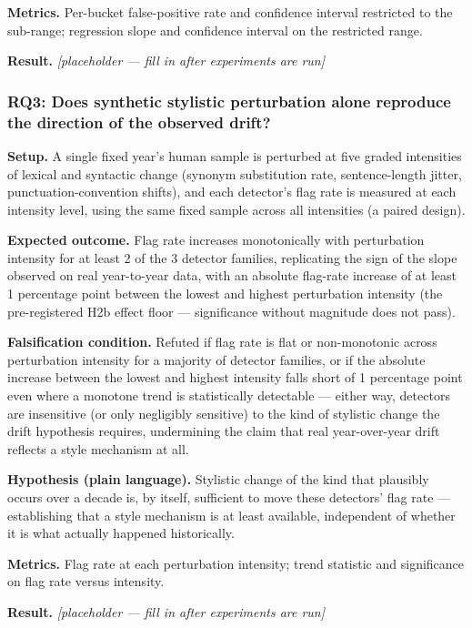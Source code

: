 \documentclass[11pt]{article}
\newcommand{\ph}{\textit{[placeholder --- fill in after experiments are run]}}
\begin{document}
\textbf{Metrics.} Per-bucket false-positive rate and confidence interval restricted to the sub-range; regression slope and confidence interval on the restricted range.

\textbf{Result.} \ph

\subsubsection{RQ3: Does synthetic stylistic perturbation alone reproduce the direction of the observed drift?}
\textbf{Setup.} A single fixed year's human sample is perturbed at five graded intensities of lexical and syntactic change (synonym substitution rate, sentence-length jitter, punctuation-convention shifts), and each detector's flag rate is measured at each intensity level, using the same fixed sample across all intensities (a paired design).

\textbf{Expected outcome.} Flag rate increases monotonically with perturbation intensity for at least 2 of the 3 detector families, replicating the sign of the slope observed on real year-to-year data, with an absolute flag-rate increase of at least 1 percentage point between the lowest and highest perturbation intensity (the pre-registered H2b effect floor --- significance without magnitude does not pass).

\textbf{Falsification condition.} Refuted if flag rate is flat or non-monotonic across perturbation intensity for a majority of detector families, or if the absolute increase between the lowest and highest intensity falls short of 1 percentage point even where a monotone trend is statistically detectable --- either way, detectors are insensitive (or only negligibly sensitive) to the kind of stylistic change the drift hypothesis requires, undermining the claim that real year-over-year drift reflects a style mechanism at all.

\textbf{Hypothesis (plain language).} Stylistic change of the kind that plausibly occurs over a decade is, by itself, sufficient to move these detectors' flag rate --- establishing that a style mechanism is at least available, independent of whether it is what actually happened historically.

\textbf{Metrics.} Flag rate at each perturbation intensity; trend statistic and significance on flag rate versus intensity.

\textbf{Result.} \ph
\end{document}
